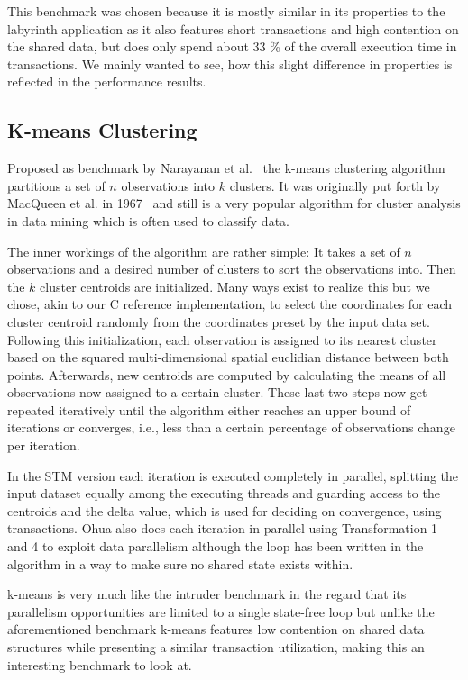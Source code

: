 This benchmark was chosen because it is mostly similar in its properties to the labyrinth application as it also features short transactions and high contention on the shared data, but does only spend about 33 \% of the overall execution time in transactions.
We mainly wanted to see, how this slight difference in properties is reflected in the performance results.


\subsection{K-means Clustering}
\label{sec:experiments:kmeans}

Proposed as benchmark by Narayanan et al.~\cite{narayanan2006minebench} the k-means clustering algorithm partitions a set of $n$ observations into $k$ clusters.
It was originally put forth by MacQueen et al. in 1967~\cite{macqueen1967some} and still is a very popular algorithm for cluster analysis in data mining which is often used to classify data.

The inner workings of the algorithm are rather simple: It takes a set of $n$ observations and a desired number of clusters to sort the observations into.
Then the $k$ cluster centroids are initialized.
Many ways exist to realize this but we chose, akin to our C reference implementation, to select the coordinates for each cluster centroid randomly from the coordinates preset by the input data set.
Following this initialization, each observation is assigned to its nearest cluster based on the squared multi-dimensional spatial euclidian distance between both points.
Afterwards, new centroids are computed by calculating the means of all observations now assigned to a certain cluster.
These last two steps now get repeated iteratively until the algorithm either reaches an upper bound of iterations or converges, i.e., less than a certain percentage of observations change per iteration.

In the STM version each iteration is executed completely in parallel, splitting the input dataset equally among the executing threads and guarding access to the centroids and the delta value, which is used for deciding on convergence, using transactions.
Ohua also does each iteration in parallel using Transformation 1 and 4 to exploit data parallelism although the loop has been written in the algorithm in a way to make sure no shared state exists within.

k-means is very much like the intruder benchmark in the regard that its parallelism opportunities are limited to a single state-free loop but unlike the aforementioned benchmark k-means features low contention on shared data structures while presenting a similar transaction utilization, making this an interesting benchmark to look at.

